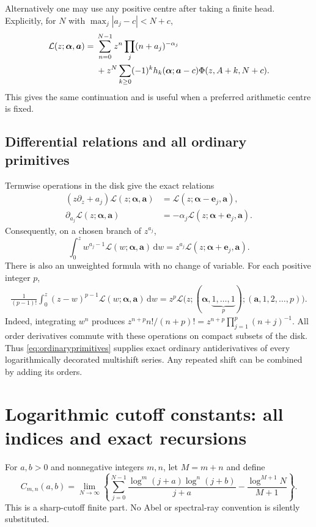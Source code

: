\documentclass[11pt,a4paper]{article}
\numberwithin{equation}{section}
\theoremstyle{definition}\newtheorem{definition}[theorem]{Definition}
\theoremstyle{remark}\newtheorem{remark}[theorem]{Remark}
\newcommand{\dd}{\,\mathrm d}
\newcommand{\av}{\boldsymbol\alpha}\newcommand{\dv}{\boldsymbol d}
\begin{document}
Alternatively one may use any positive centre after taking a finite
head. Explicitly, for $N$ with $\max_j|a_j-c|<N+c$,
\begin{align}
 \mathcal L(z;\av,\boldsymbol a)
 ={}&\sum_{n=0}^{N-1}z^n\prod_j(n+a_j)^{-\alpha_j}\notag\\
 &+z^N\sum_{k\ge0}(-1)^kh_k(\av;\boldsymbol a-c)
                         \Phi(z,A+k,N+c).
 \label{eq:unilateralhead}
\end{align}
This gives the same continuation and is useful when a preferred
arithmetic centre is fixed.

\subsection{Differential relations and all ordinary primitives}
Termwise operations in the disk give the exact relations
\begin{align}
 (z\partial_z+a_j)\mathcal L(z;\av,\boldsymbol a)
       &=\mathcal L(z;\av-\boldsymbol e_j,\boldsymbol a),\label{eq:eulerderivative}\\
 \partial_{a_j}\mathcal L(z;\av,\boldsymbol a)
       &=-\alpha_j\mathcal L(z;\av+\boldsymbol e_j,\boldsymbol a).
 \label{eq:shiftderivative}
\end{align}
Consequently, on a chosen branch of $z^{a_j}$,
\begin{equation}
 \int_0^z w^{a_j-1}\mathcal L(w;\av,\boldsymbol a)\dd w
    =z^{a_j}\mathcal L(z;\av+\boldsymbol e_j,\boldsymbol a).
 \label{eq:eulerprimitive}
\end{equation}
There is also an unweighted formula with no change of variable.
For each positive integer $p$,
\begin{align}
 \frac1{(p-1)!}\int_0^z(z-w)^{p-1}
                \mathcal L(w;\av,\boldsymbol a)\dd w
  =z^p\mathcal L\bigl(z; (\av,\underbrace{1,\ldots,1}_{p});
                     (\boldsymbol a,1,2,\ldots,p)\bigr).
 \label{eq:ordinaryprimitives}
\end{align}
Indeed, integrating $w^n$ produces
$z^{n+p}n!/(n+p)!=z^{n+p}\prod_{j=1}^p(n+j)^{-1}$.
All order derivatives commute with these operations on compact subsets
of the disk. Thus \eqref{eq:ordinaryprimitives} supplies exact ordinary
antiderivatives of every logarithmically decorated multishift series.
Any repeated shift can be combined by adding its orders.

\section{Logarithmic cutoff constants: all indices and exact recursions}
\label{sec:cutoff}
For $a,b>0$ and nonnegative integers $m,n$, let $M=m+n$ and define
\begin{equation}
 C_{m,n}(a,b)=\lim_{N\to\infty}\left\{
  \sum_{j=0}^{N-1}\frac{\log^m(j+a)\log^n(j+b)}{j+a}
          -\frac{\log^{M+1}N}{M+1}\right\}.
 \label{eq:Cdef}
\end{equation}
This is a sharp-cutoff finite part. No Abel or spectral-ray convention
is silently substituted.
\end{document}
